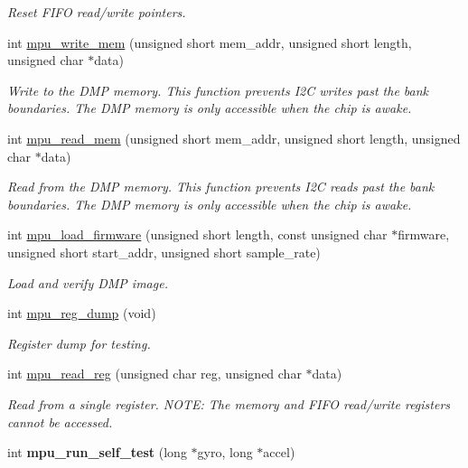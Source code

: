 \begin{DoxyCompactItemize}
\begin{DoxyCompactList}\small\item\em Reset F\+I\+FO read/write pointers. \end{DoxyCompactList}\item 
int \hyperlink{group___d_r_i_v_e_r_s_gafea59910bc3dd30ba3356b1c75213a5f}{mpu\+\_\+write\+\_\+mem} (unsigned short mem\+\_\+addr, unsigned short length, unsigned char $\ast$data)
\begin{DoxyCompactList}\small\item\em Write to the D\+MP memory. This function prevents I2C writes past the bank boundaries. The D\+MP memory is only accessible when the chip is awake. \end{DoxyCompactList}\item 
int \hyperlink{group___d_r_i_v_e_r_s_ga3374bececb6743893c9eab27645c1182}{mpu\+\_\+read\+\_\+mem} (unsigned short mem\+\_\+addr, unsigned short length, unsigned char $\ast$data)
\begin{DoxyCompactList}\small\item\em Read from the D\+MP memory. This function prevents I2C reads past the bank boundaries. The D\+MP memory is only accessible when the chip is awake. \end{DoxyCompactList}\item 
int \hyperlink{group___d_r_i_v_e_r_s_ga8fbdfe1a50285d4ab438e29c2efc70f5}{mpu\+\_\+load\+\_\+firmware} (unsigned short length, const unsigned char $\ast$firmware, unsigned short start\+\_\+addr, unsigned short sample\+\_\+rate)
\begin{DoxyCompactList}\small\item\em Load and verify D\+MP image. \end{DoxyCompactList}\item 
int \hyperlink{group___d_r_i_v_e_r_s_ga0e1201ecfd8453f1d89e4299528baaf6}{mpu\+\_\+reg\+\_\+dump} (void)
\begin{DoxyCompactList}\small\item\em Register dump for testing. \end{DoxyCompactList}\item 
int \hyperlink{group___d_r_i_v_e_r_s_ga5c35a3363337014e11769a0ea7c0dfa9}{mpu\+\_\+read\+\_\+reg} (unsigned char reg, unsigned char $\ast$data)
\begin{DoxyCompactList}\small\item\em Read from a single register. N\+O\+TE\+: The memory and F\+I\+FO read/write registers cannot be accessed. \end{DoxyCompactList}\item 
int {\bfseries mpu\+\_\+run\+\_\+self\+\_\+test} (long $\ast$gyro, long $\ast$accel)\hypertarget{group___d_r_i_v_e_r_s_ga3773dc98eb1ba15da0091ae75abcf62f}{}\label{group___d_r_i_v_e_r_s_ga3773dc98eb1ba15da0091ae75abcf62f}


\end{DoxyCompactItemize}
